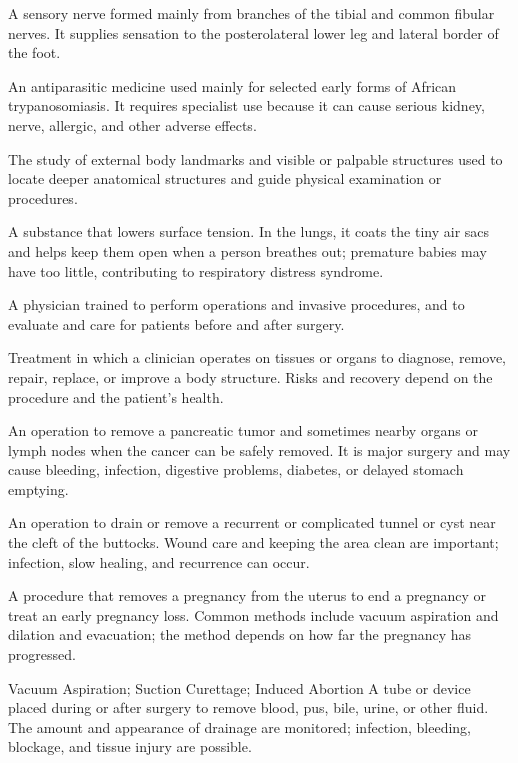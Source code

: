  A sensory nerve formed mainly from branches of the tibial and common fibular nerves. It supplies sensation to the posterolateral lower leg and lateral border of the foot.

 An antiparasitic medicine used mainly for selected early forms of African trypanosomiasis. It requires specialist use because it can cause serious kidney, nerve, allergic, and other adverse effects.

 The study of external body landmarks and visible or palpable structures used to locate deeper anatomical structures and guide physical examination or procedures.

 A substance that lowers surface tension. In the lungs, it coats the tiny air sacs and helps keep them open when a person breathes out; premature babies may have too little, contributing to respiratory distress syndrome.

 A physician trained to perform operations and invasive procedures, and to evaluate and care for patients before and after surgery.

 Treatment in which a clinician operates on tissues or organs to diagnose, remove, repair, replace, or improve a body structure. Risks and recovery depend on the procedure and the patient's health.

 An operation to remove a pancreatic tumor and sometimes nearby organs or lymph nodes when the cancer can be safely removed. It is major surgery and may cause bleeding, infection, digestive problems, diabetes, or delayed stomach emptying.

 An operation to drain or remove a recurrent or complicated tunnel or cyst near the cleft of the buttocks. Wound care and keeping the area clean are important; infection, slow healing, and recurrence can occur.

 A procedure that removes a pregnancy from the uterus to end a pregnancy or treat an early pregnancy loss. Common methods include vacuum aspiration and dilation and evacuation; the method depends on how far the pregnancy has progressed.

\synonyms
Vacuum Aspiration; Suction Curettage; Induced Abortion
 A tube or device placed during or after surgery to remove blood, pus, bile, urine, or other fluid. The amount and appearance of drainage are monitored; infection, bleeding, blockage, and tissue injury are possible.

